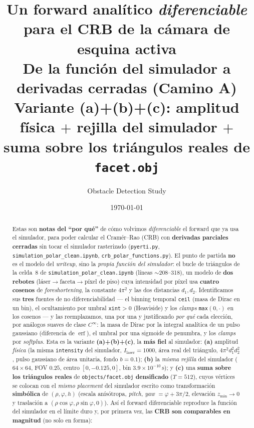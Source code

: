 \documentclass[11pt,a4paper]{article}
\title{Un forward anal\'itico \emph{diferenciable} para el CRB de la
c\'amara de esquina activa\\[4pt]
\large De la \textbf{funci\'on del simulador} a derivadas cerradas (Camino A)\\[2pt]
\normalsize Variante \textbf{(a)+(b)+(c)}: amplitud f\'isica $+$ rejilla del
simulador $+$ suma sobre los tri\'angulos reales de \texttt{facet.obj}}
\author{Obstacle Detection Study}
\date{\today}
\theoremstyle{plain}
\theoremstyle{definition}
\newcommand{\erf}{\operatorname{erf}}
\begin{document}
\maketitle

\begin{abstract}
Estas son \textbf{notas del ``por qu\'e''} de c\'omo volvimos
\emph{diferenciable} el forward que ya usa el simulador, para poder calcular el
Cram\'er--Rao (CRB) con \textbf{derivadas parciales cerradas} sin tocar el
simulador rasterizado (\texttt{pyerti.py},
\texttt{simulation\_polar\_clean.ipynb}, \texttt{crb\_polar\_functions.py}).
El punto de partida \textbf{no} es el modelo del \emph{writeup}, sino la
\emph{propia funci\'on del simulador}: el bucle de tri\'angulos de la celda~8 de
\texttt{simulation\_polar\_clean.ipynb} (l\'ineas $\sim$208--318), un modelo de
\textbf{dos rebotes} (l\'aser$\to$faceta$\to$p\'ixel de piso) cuya intensidad por
p\'ixel usa \textbf{cuatro cosenos} de \emph{foreshortening}, la constante
$4\pi^2$ y las dos distancias $d_1,d_2$. Identificamos sus \textbf{tres} fuentes
de no diferenciabilidad --- el binning temporal \texttt{ceil} (masa de Dirac en
un bin), el ocultamiento por umbral \texttt{xint}$>0$ (Heaviside) y los
\emph{clamps} \texttt{max}$(0,\cdot)$ en los cosenos --- y las reemplazamos, una
por una y justificando \emph{por qu\'e} cada elecci\'on, por an\'alogos suaves de
clase $C^\infty$: la masa de Dirac por la integral anal\'itica de un pulso
gaussiano (diferencia de $\erf$), el umbral por una sigmoide de penumbra, y los
\emph{clamps} por \emph{softplus}. Esta es la variante \textbf{(a)+(b)+(c)}, la
\textbf{m\'as fiel} al simulador: \textbf{(a)} amplitud \emph{f\'isica} (la misma
\texttt{intensity} del simulador, $I_{\mathrm{laser}}\!=\!1000$, \'area real del
tri\'angulo, $4\pi^2 d_1^2 d_2^2$, pulso gaussiano de \'area unitaria, fondo
$b\!=\!0.1$); \textbf{(b)} la \emph{misma rejilla} del simulador ($64\times64$,
FOV $0.25$, centro $[0,-0.125,0]$, bin $3.9\times10^{-10}$\,s); y \textbf{(c)} una
\textbf{suma sobre los tri\'angulos reales} de \texttt{objects/facet.obj}
\textbf{densificado} ($T=512$), cuyos v\'ertices se colocan con el \emph{mismo}
\emph{placement} del simulador escrito como transformaci\'on \textbf{simb\'olica}
de $(\rho,\varphi,h)$ (escala
an\'is\'otropa, \emph{pitch}, \emph{yaw} $=\varphi+3\pi/2$, elevaci\'on
$z_{\min}\!\to\!0$ y traslaci\'on a $(\rho\cos\varphi,\rho\sin\varphi,0)$). As\'i el
forward diferenciable reproduce la funci\'on del simulador en el l\'imite duro y,
por primera vez, las \textbf{CRB son comparables en magnitud} (no solo en forma):

\end{abstract}
\end{document}
